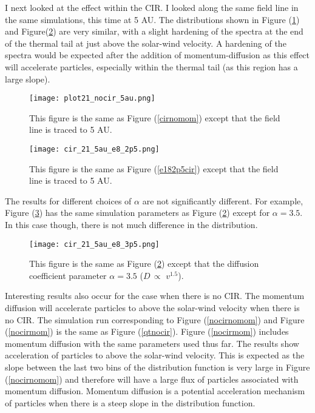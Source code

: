 \documentclass[%
 reprint,
 amsmath,amssymb,
 aps,
]{revtex4-1}
\begin{document}
I next looked at the effect within the CIR.  I looked along the same field line in the same simulations, this time at 5 AU. The distributions shown in Figure (\ref{incirnomom}) and Figure(\ref{incire182p5}) are very similar, with a slight hardening of the spectra at the end of the thermal tail at just above the solar-wind velocity. A hardening of the spectra would be expected after the addition of momentum-diffusion as this effect will accelerate particles, especially within the thermal tail (as this region has a large slope). 

\begin{figure}[h]
\texttt{[image: plot21\_nocir\_5au.png]}
\caption{This figure is the same as Figure (\ref{cirnomom}) except that the field line is traced to 5 AU. \label{incirnomom}}
\end{figure}

\begin{figure}[h]
\texttt{[image: cir\_21\_5au\_e8\_2p5.png]}
\caption{This figure is the same as Figure (\ref{e182p5cir}) except that the field line is traced to 5 AU. \label{incire182p5}}
\end{figure}

The results for different choices of $\alpha$ are not significantly different. For example, Figure (\ref{3p5incir}) has the same simulation parameters as Figure (\ref{incire182p5}) except for $\alpha = 3.5$. In this case though, there is not much difference in the distribution.

\begin{figure}[h]
\texttt{[image: cir\_21\_5au\_e8\_3p5.png]}
\caption{This figure is the same as Figure (\ref{incire182p5}) except that the diffusion coefficient parameter $\alpha = 3.5$ ($D \, \propto \,\, v^{1.5}$). \label{3p5incir}}
\end{figure}

Interesting results also occur for the case when there is no CIR. The momentum diffusion will accelerate particles to above the solar-wind velocity when there is no CIR. The simulation run corresponding to Figure (\ref{nocirnomom}) and Figure (\ref{nocirmom}) is the same as Figure (\ref{qtnocir}). Figure (\ref{nocirmom}) includes momentum diffusion with the same parameters used thus far. The results show acceleration of particles to above the solar-wind velocity. This is expected as the slope between the last two bins of the distribution function is very large in Figure (\ref{nocirnomom}) and therefore will have a large flux of particles associated with momentum diffusion. Momentum diffusion is a potential acceleration mechanism of particles when there is a steep slope in the distribution function.
\end{document}
